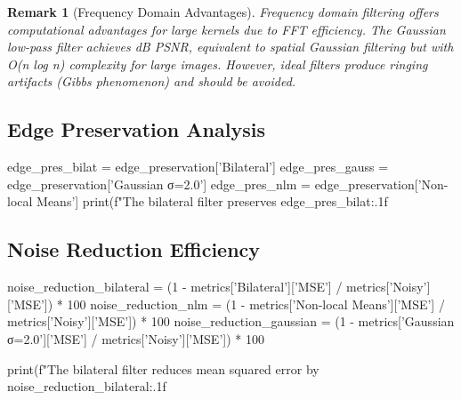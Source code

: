 \documentclass[a4paper, 11pt]{article}
\newtheorem{remark}{Remark}[section]
\begin{document}
\begin{remark}[Frequency Domain Advantages]
Frequency domain filtering offers computational advantages for large kernels due to FFT efficiency. The Gaussian low-pass filter achieves  dB PSNR, equivalent to spatial Gaussian filtering but with O(n log n) complexity for large images. However, ideal filters produce ringing artifacts (Gibbs phenomenon) and should be avoided.
\end{remark}

\subsection{Edge Preservation Analysis}

\begin{pycode}
edge_pres_bilat = edge_preservation['Bilateral']
edge_pres_gauss = edge_preservation['Gaussian σ=2.0']
edge_pres_nlm = edge_preservation['Non-local Means']
print(f"The bilateral filter preserves {edge_pres_bilat:.1f}\\%
\end{pycode}

\subsection{Noise Reduction Efficiency}

\begin{pycode}
noise_reduction_bilateral = (1 - metrics['Bilateral']['MSE'] / metrics['Noisy']['MSE']) * 100
noise_reduction_nlm = (1 - metrics['Non-local Means']['MSE'] / metrics['Noisy']['MSE']) * 100
noise_reduction_gaussian = (1 - metrics['Gaussian σ=2.0']['MSE'] / metrics['Noisy']['MSE']) * 100

print(f"The bilateral filter reduces mean squared error by {noise_reduction_bilateral:.1f}\\%
\end{pycode}
\end{document}
